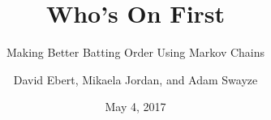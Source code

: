 \documentclass[xcolor=dvipsnames]{beamer}
\title{Who's On First}
\subtitle{Making Better Batting Order Using Markov Chains}
\author{David Ebert, Mikaela Jordan, and Adam Swayze}
\institute{Tarleton State University Math Day}
\date{May 4, 2017}
\newenvironment{reference}[2]{
\begin{textblock*}{\textwidth}(#1,#2)              
  \footnotesize\it\bgroup\color{red!50!black}}{\egroup\end{textblock*}}
\begin{document}
\makeatletter
\def\beamer@framenotesbegin{
\begin{reference}{107mm}{0.5mm}
\tikz\node[opacity=1.0]{\texttt{[image: images/tsumath\_copy.png]}};
\end{reference} 
}

\frame{\titlepage}

\begin{frame}
	\frametitle{
\end{frame}
\end{document}
